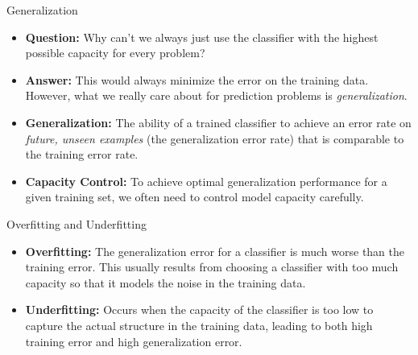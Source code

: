 \documentclass[serif,xcolor=pdftex,dvipsnames,table,hyperref={bookmarks=false}]{beamer}
\begin{document}
\begin{frame}[t]{Generalization}

\begin{itemize}
\setlength{\itemsep}{12pt}

\item \textbf{Question:} Why can't we always just use the classifier with the highest possible capacity for every problem? 

\pause\item \textbf{Answer:} This would always minimize the error on the training data. However, what we really care about for prediction problems is \textit{generalization}.

\pause\item \textbf{Generalization:} The ability of a trained classifier to achieve an error rate on \textit{future, unseen examples} (the generalization error rate) that is comparable to the training error rate. 

\pause\item \textbf{Capacity Control:} To achieve optimal generalization performance for a given training set, we often need to control model capacity carefully. 

\end{itemize}

\end{frame}

\begin{frame}[t]{Overfitting and Underfitting}

\begin{itemize}
\setlength{\itemsep}{12pt}

\item \textbf{Overfitting:} The generalization error for a classifier is much worse than the training error. This usually results from choosing a classifier with too much capacity so that it models the noise in the training data.

\item \textbf{Underfitting:} Occurs when the capacity of the classifier is too low to capture the actual structure in the training data, leading to both high training error and high generalization error.

\end{itemize}

\end{frame}
\end{document}

